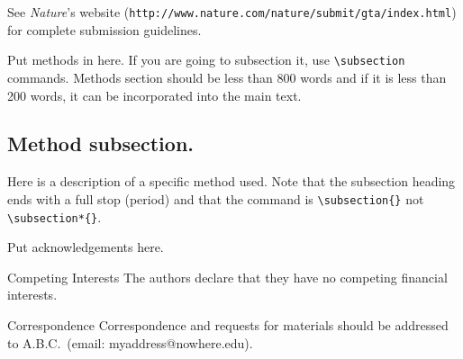 \documentclass{naturemod}
\begin{document}
See \textsl{Nature}'s website
(\texttt{http://www.nature.com/nature/submit/gta/index.html}) for
complete submission guidelines.

\begin{methods}
Put methods in here.  If you are going to subsection it, use
\verb|\subsection| commands.  Methods section should be less than
800 words and if it is less than 200 words, it can be incorporated
into the main text.

\subsection{Method subsection.}

Here is a description of a specific method used.  Note that the
subsection heading ends with a full stop (period) and that the
command is \verb|\subsection{}| not \verb|\subsection*{}|.

\end{methods}





\begin{addendum}
 \item Put acknowledgements here.
 \item[Competing Interests] The authors declare that they have no
competing financial interests.
 \item[Correspondence] Correspondence and requests for materials
should be addressed to A.B.C.~(email: myaddress@nowhere.edu).
\end{addendum}

\end{document}
